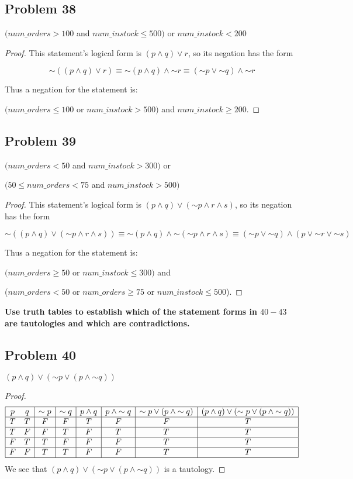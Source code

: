 \documentclass[14pt]{extarticle}
\begin{document}
\subsection{Problem 38}
$(num\_orders > 100$ and $num\_instock \leq 500)$ or $num\_instock < 200$

\begin{proof}
This statement’s logical form is $(p \wedge q) \vee r$, so its negation has the
form

$$
{\sim((p \wedge q) \vee r)} \equiv {\sim (p \wedge q)} \wedge {\sim r}
\equiv ({\sim p} \vee {\sim q}) \wedge {\sim r}
$$

Thus a negation for the statement is:

$(num\_orders \leq 100$ or $num\_instock > 500)$ and $num\_instock \geq 200$.
\end{proof}

\subsection{Problem 39}
$(num\_orders < 50$ and $num\_instock > 300)$ or

$(50 \leq num\_orders < 75$ and $num\_instock > 500)$

\begin{proof}
This statement’s logical form is $(p \wedge q) \vee ({\sim p} \wedge r \wedge
s)$, so its negation has the form

$$
{\sim((p \wedge q) \vee ({\sim p} \wedge r \wedge s))} \equiv
{\sim(p \wedge q)} \wedge {\sim({\sim p} \wedge r \wedge s)} \equiv
({\sim p} \vee {\sim q}) \wedge (p \vee {\sim r} \vee {\sim s})
$$

Thus a negation for the statement is:

$(num\_orders \geq 50$ or $num\_instock \leq 300)$ and

($num\_orders < 50$ or $num\_orders \geq 75$ or $num\_instock \leq 500$).
\end{proof}

{\bf Use truth tables to establish which of the statement forms in $40-43$ are
tautologies and which are contradictions.}

\subsection{Problem 40}
$(p \wedge q) \vee ({\sim p} \vee (p \wedge {\sim q}))$

\begin{proof}
$$
\begin{array}{|cc|c|c|c|c|c|c|}
\hline
p & q & {\sim p} & {\sim q} & p \wedge q & p \wedge {\sim q} &
{\sim p} \vee (p \wedge {\sim q}) &
(p \wedge q) \vee ({\sim p} \vee (p \wedge {\sim q})) \\
\hline
T & T & F & F & T & F & F & T \\
\hline
T & F & F & T & F & T & T & T \\
\hline
F & T & T & F & F & F & T & T \\
\hline
F & F & T & T & F & F & T & T \\
\hline
\end{array}
$$
We see that $(p \wedge q) \vee ({\sim p} \vee (p \wedge {\sim q}))$ is a
tautology.
\end{proof}
\end{document}
